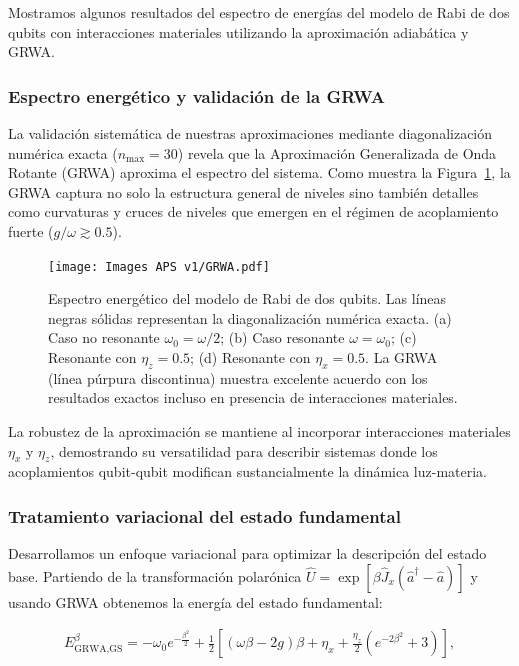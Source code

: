 \documentclass[onecolumn,notitlepage,letterpaper,aps,pra,12pt]{article}
\numberwithin{equation}{section}
\begin{document}
Mostramos algunos resultados del espectro de energías del modelo de Rabi de dos qubits con interacciones materiales utilizando la aproximación adiabática y GRWA. 

\subsubsection{Espectro energético y validación de la GRWA}

La validación sistemática de nuestras aproximaciones mediante diagonalización numérica exacta ($n_{\text{max}}=30$) revela que la Aproximación Generalizada de Onda Rotante (GRWA) aproxima el espectro del sistema. Como muestra la Figura~\ref{fig: Conventional GRWA}, la GRWA captura no solo la estructura general de niveles sino también detalles  como curvaturas y cruces de niveles que emergen en el régimen de acoplamiento fuerte ($g/\omega \gtrsim 0.5$).

\begin{figure}[H]
    \centering
    \texttt{[image: Images APS v1/GRWA.pdf]}
    \caption{Espectro energético del modelo de Rabi de dos qubits. Las líneas negras sólidas representan la diagonalización numérica exacta. (a) Caso no resonante $\omega_0 = \omega/2$; (b) Caso resonante $\omega = \omega_0$; (c) Resonante con $\eta_z = 0.5$; (d) Resonante con $\eta_x = 0.5$. La GRWA (línea púrpura discontinua) muestra excelente acuerdo con los resultados exactos incluso en presencia de interacciones materiales.}
    \label{fig: Conventional GRWA}
\end{figure}

La robustez de la aproximación se mantiene al incorporar interacciones materiales $\eta_x$ y $\eta_z$, demostrando su versatilidad para describir sistemas donde los acoplamientos qubit-qubit modifican sustancialmente la dinámica luz-materia.

\subsubsection{Tratamiento variacional del estado fundamental}

Desarrollamos un enfoque variacional para optimizar la descripción del estado base. Partiendo de la transformación polarónica $\hat{U} = \exp\left[ \beta\hat{J}_{x}(\hat{a}^{\dagger} - \hat{a}) \right]$ y usando GRWA obtenemos la energía del estado fundamental:

\begin{gather}
E_{\text{GRWA,GS}}^{\beta} = -\omega_{0} e^{-\frac{\beta^{2}}{2}} + \frac{1}{2}\left[ (\omega \beta -2g)\beta + \eta_{x} + \frac{\eta_{z}}{2}\left(e^{-2\beta^{2}}+3 \right) \right],
\end{gather}
\end{document}
